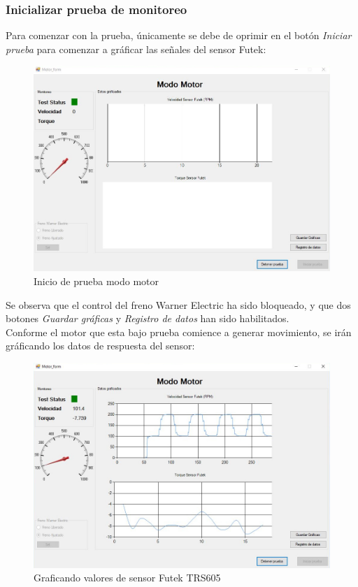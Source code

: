\documentclass[12pt,titlepage]{article}
\begin{document}
\newpage
\subsubsection{Inicializar prueba de monitoreo}
Para comenzar con la prueba, únicamente se debe de oprimir en el botón \textit{Iniciar prueba} para comenzar a gráficar las señales del sensor Futek: \\ 
\begin{figure}[htbp]
\hspace*{2.1cm} 
\includegraphics[scale=0.57]{init_test}
\caption{Inicio de prueba modo motor}
\end{figure}

Se observa que el control del freno Warner Electric ha sido bloqueado, y que dos botones \textit{Guardar gráficas} y \textit{Registro de datos} han sido habilitados. \\ 
\newpage
Conforme el motor que esta bajo prueba comience a generar movimiento, se irán gráficando los datos de respuesta del sensor: \\

\begin{figure}[htbp]
\hspace*{1.8cm} 
\includegraphics[scale=0.57]{test}
\caption{Graficando valores de sensor Futek TRS605}
\end{figure}
 
\end{document}
